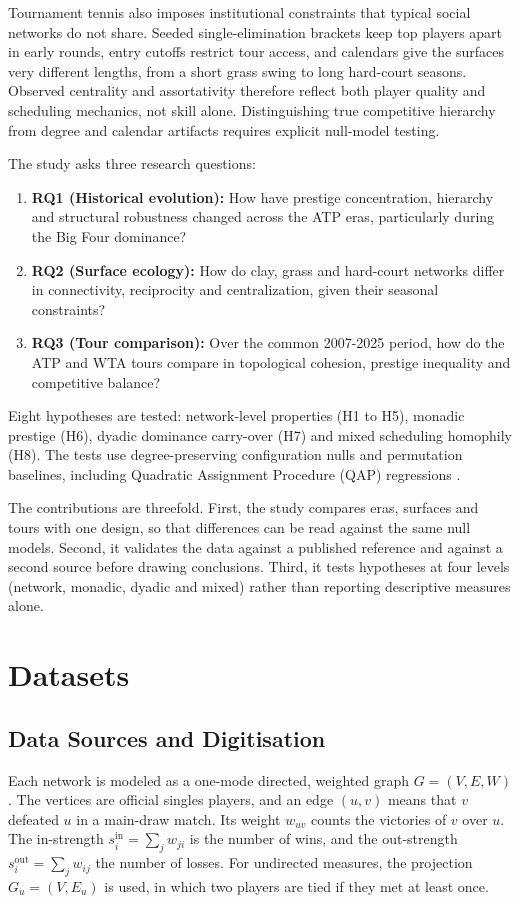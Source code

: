 \documentclass[12pt, a4paper]{article}
\begin{document}
Tournament tennis also imposes institutional constraints that typical social networks do not share. Seeded single-elimination brackets keep top players apart in early rounds, entry cutoffs restrict tour access, and calendars give the surfaces very different lengths, from a short grass swing to long hard-court seasons. Observed centrality and assortativity therefore reflect both player quality and scheduling mechanics, not skill alone. Distinguishing true competitive hierarchy from degree and calendar artifacts requires explicit null-model testing.

The study asks three research questions:
\begin{enumerate}
    \item \textbf{RQ1 (Historical evolution):} How have prestige concentration, hierarchy and structural robustness changed across the ATP eras, particularly during the Big Four dominance?
    \item \textbf{RQ2 (Surface ecology):} How do clay, grass and hard-court networks differ in connectivity, reciprocity and centralization, given their seasonal constraints?
    \item \textbf{RQ3 (Tour comparison):} Over the common 2007-2025 period, how do the ATP and WTA tours compare in topological cohesion, prestige inequality and competitive balance?
\end{enumerate}
Eight hypotheses are tested: network-level properties (H1 to H5), monadic prestige (H6), dyadic dominance carry-over (H7) and mixed scheduling homophily (H8). The tests use degree-preserving configuration nulls and permutation baselines, including Quadratic Assignment Procedure (QAP) regressions \cite{krackhardt1988,maslov2002}.

The contributions are threefold. First, the study compares eras, surfaces and tours with one design, so that differences can be read against the same null models. Second, it validates the data against a published reference and against a second source before drawing conclusions. Third, it tests hypotheses at four levels (network, monadic, dyadic and mixed) rather than reporting descriptive measures alone.

\section{Datasets}
\label{datasets}

\subsection{Data Sources and Digitisation}
Each network is modeled as a one-mode directed, weighted graph $G = (V, E, W)$. The vertices are official singles players, and an edge $(u, v)$ means that $v$ defeated $u$ in a main-draw match. Its weight $w_{uv}$ counts the victories of $v$ over $u$. The in-strength $s_i^{\mathrm{in}} = \sum_j w_{ji}$ is the number of wins, and the out-strength $s_i^{\mathrm{out}} = \sum_j w_{ij}$ the number of losses. For undirected measures, the projection $G_u = (V, E_u)$ is used, in which two players are tied if they met at least once.
\end{document}

